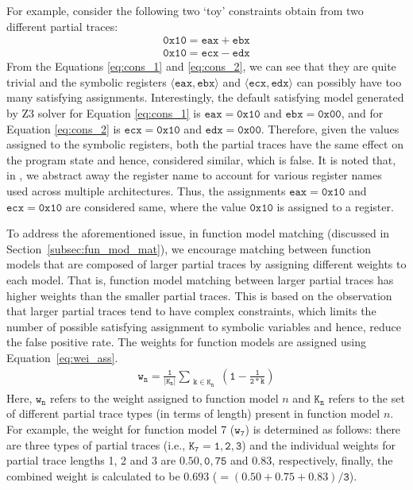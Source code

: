 For example, consider the following two `toy' constraints obtain from two different partial traces:
\begin{eqnarray}
\mathtt{0x10 = eax+ebx} \label{eq:cons_1} \\
\mathtt{0x10 = ecx-edx} \label{eq:cons_2}
\end{eqnarray}
From the Equations \ref{eq:cons_1} and \ref{eq:cons_2}, we can see that they are quite trivial and the symbolic registers $\mathtt{\langle eax,ebx\rangle}$ and $\mathtt{\langle ecx,edx\rangle}$ can possibly have too many satisfying assignments. Interestingly, the default satisfying model generated by Z3 solver for Equation \ref{eq:cons_1} is $\mathtt{eax=0x10}$ and $\mathtt{ebx=0x00}$, and for Equation \ref{eq:cons_2} is $\mathtt{ecx=0x10}$ and $\mathtt{edx=0x00}$. Therefore, given the values assigned to the symbolic registers, both the partial traces have the same effect on the program state and hence, considered similar, which is false. It is noted that, in \tool, we abstract away the register name to account for various register names used across multiple architectures. Thus, the assignments $\mathtt{eax=0x10}$ and $\mathtt{ecx=0x10}$ are considered same, where the value $\mathtt{0x10}$ is assigned to a register.

To address the aforementioned issue, in function model matching (discussed in Section~\ref{subsec:fun_mod_mat}), we encourage matching between function models that are composed of larger partial traces by assigning different weights to each model. That is, function model matching between larger partial traces has higher weights than the smaller partial traces. This is based on the observation that larger partial traces tend to have complex constraints, which limits the number of possible satisfying assignment to symbolic variables and hence, reduce the false positive rate. The weights for function models are assigned using Equation~\ref{eq:wei_ass}.
\begin{eqnarray}
\mathtt{w_n=\frac{1}{\vert K_n \vert}\sum_{\substack{\mathtt{k} \in \mathtt{K_n}}}\left(1-\frac{1}{2*k} \right)} \label{eq:wei_ass}
\end{eqnarray}
Here, $\mathtt{w_n}$ refers to the weight assigned to function model $n$ and $\mathtt{K_n}$ refers to the set of different partial trace types (in terms of length) present in function model $n$. For example, the weight for function model 7 ($\mathtt{w_7}$) is determined as follows: there are three types of partial traces (i.e., $\mathtt{K_7={1,2,3}}$) and the individual weights for partial trace lengths 1, 2 and 3 are $\mathtt{0.50, 0,75}$ and $\mathtt{0.83}$, respectively, finally, the combined weight is calculated to be $\mathtt{0.693}$ ($=\mathtt{(0.50+0.75+0.83)/3}$).


